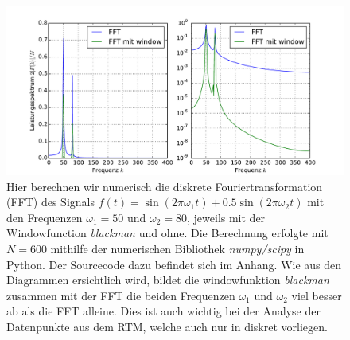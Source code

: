\begin{figure}
\includegraphics[width=17cm]{pics/stm2}
\caption{Hier berechnen wir numerisch die diskrete
    Fouriertransformation (FFT) des Signals  
$f(t)=\sin(2\pi \omega_1 t) + 0.5 \sin(2\pi \omega_2 t)$ mit den 
Frequenzen $\omega_1 = 50$ und $\omega_2 = 80$, jeweils mit
der Windowfunction \textit{blackman} und ohne. 
Die Berechnung erfolgte mit $N=600$ mithilfe der numerischen
Bibliothek \textit{numpy/scipy} in Python\cite{scipy_reference}.
Der Sourcecode dazu befindet sich im Anhang.
Wie aus den Diagrammen ersichtlich wird, bildet die windowfunktion
\textit{blackman} zusammen mit der FFT
die  beiden Frequenzen $\omega_1$ und $\omega_2$ viel besser ab
als die FFT alleine. Dies ist auch wichtig bei der Analyse der
Datenpunkte aus dem RTM, welche auch nur in diskret vorliegen.
}
 \label{fig:stm2}
\end{figure}


